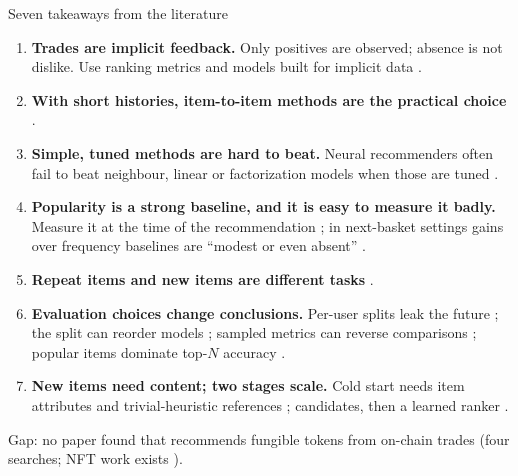\documentclass[aspectratio=169,10pt]{beamer}
\newcommand{\toindex}{\hfill\hyperlink{index}{\beamerreturnbutton{index}}}
\begin{document}
\begin{frame}[label=litsum]{Seven takeaways from the literature \toindex}
  \footnotesize
  \begin{enumerate}
    \setlength{\itemsep}{1pt}
    \item \textbf{Trades are implicit feedback.} Only positives are observed; absence is not dislike. Use ranking metrics and models built for implicit data \cite{hu2008,rendle2009}.
    \item \textbf{With short histories, item-to-item methods are the practical choice} \cite{sarwar2001,hidasi2016,ludewig2018}.
    \item \textbf{Simple, tuned methods are hard to beat.} Neural recommenders often fail to beat neighbour, linear or factorization models when those are tuned \cite{dacrema2019,rendle2020,rendle2021,anelli2022}.
    \item \textbf{Popularity is a strong baseline, and it is easy to measure it badly.} Measure it at the time of the recommendation \cite{ji2020pop}; in next-basket settings gains over frequency baselines are ``modest or even absent'' \cite{li2021}.
    \item \textbf{Repeat items and new items are different tasks} \cite{li2021}.
    \item \textbf{Evaluation choices change conclusions.} Per-user splits leak the future \cite{ji2020leak}; the split can reorder models \cite{meng2020}; sampled metrics can reverse comparisons \cite{krichene2020}; popular items dominate top-$N$ accuracy \cite{cremonesi2010}.
    \item \textbf{New items need content; two stages scale.} Cold start needs item attributes and trivial-heuristic references \cite{schein2002}; candidates, then a learned ranker \cite{covington2016,burges2010}.
  \end{enumerate}
  {\scriptsize\color{grey} Gap: no paper found that recommends fungible tokens from on-chain trades (four searches; NFT work exists \cite{choi2024,nftmine2023}).}
\end{frame}
\end{document}
